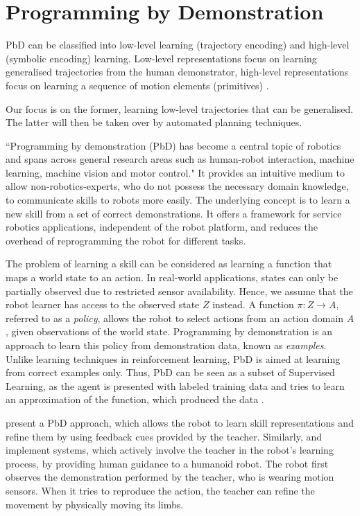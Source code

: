 \section{Programming by Demonstration}
PbD can be classified into low-level learning (trajectory encoding) and high-level (symbolic encoding) learning. Low-level representations focus on learning generalised trajectories from the human demonstrator, high-level representations focus on learning a sequence of motion elements (primitives) \cite{peppoloni2014ros}.

Our focus is on the former, learning low-level trajectories that can be generalised. The latter will then be taken over by automated planning techniques.

``Programming by demonstration (PbD) has become a central topic of robotics and spans across general research areas such as human-robot interaction, machine learning, machine vision and motor control." \cite{billard2008robot}
It provides an intuitive medium to allow non-robotics-experts, who do not possess the necessary domain knowledge, to communicate skills to robots more easily. The underlying concept is to learn a new skill from a set of correct demonstrations.
It offers a framework for service robotics applications, independent of the robot platform, and reduces the overhead of reprogramming the robot for different tasks.

The problem of learning a skill can be considered as learning a function that maps a world state to an action. In real-world applications, states can only be partially observed due to restricted sensor availability. Hence, we assume that the robot learner has access to the observed state $Z$ instead. A function $\pi : Z \rightarrow A$, referred to as a \textit{policy}, allows the robot to select actions from an action domain $A$, given observations of the world state. 
Programming by demonstration is an approach to learn this policy from demonstration data, known as \textit{examples}.
Unlike learning techniques in reinforcement learning, PbD is aimed at learning from correct examples only. Thus, PbD can be seen as a subset of Supervised Learning, as the agent is presented with labeled training data and tries to learn an approximation of the function, which produced the data \cite{argall2009survey}.

 \cite{nicolescu2003natural} present a PbD approach, which allows the robot to learn skill representations and refine them by using feedback cues provided by the teacher. Similarly, \cite{calinon2007active} and \cite{calinon2007incremental} implement systems, which actively involve the teacher in the robot's learning process, by providing human guidance to a humanoid robot. The robot first observes the demonstration performed by the teacher, who is wearing motion sensors. When it tries to reproduce the action, the teacher can refine the movement by physically moving its limbs.

